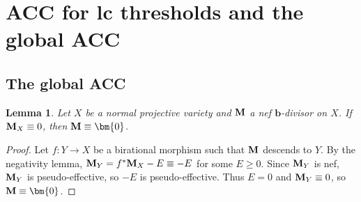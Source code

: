\documentclass[11pt]{amsart}
\numberwithin{equation}{section}
\newcommand{\bb}{\bm{b}}
\newcommand{\Mm}{{\bf{M}}}
\newcommand{\Rr}{\mathbb{R}}
\newtheorem{lem}[thm]{Lemma}
\theoremstyle{definition}
\theoremstyle{definition}
\theoremstyle{definition}
\begin{document}
\section{ACC for lc thresholds and the global ACC}\label{sec: acc gfq}

\subsection{The global ACC}\label{subsec: global acc}

\begin{lem}\label{lem: trivial trace nef imply trivial}
    Let $X$ be a normal projective variety and $\Mm$ a nef $\bb$-divisor on $X$. If $\Mm_X\equiv 0$, then $\Mm\equiv\bm{0}$.
\end{lem}
\begin{proof}
Let $f: Y\rightarrow X$ be a birational morphism such that $\Mm$ descends to $Y$. By the negativity lemma, 
$\Mm_Y=f^*\Mm_X-E\equiv -E$ for some $E\geq 0$. Since $\Mm_Y$ is nef, $\Mm_Y$ is pseudo-effective, so $-E$ is pseudo-effective. Thus $E=0$ and $\Mm_Y\equiv 0$, so $\Mm\equiv\bm{0}$.
\end{proof}
\end{document}
